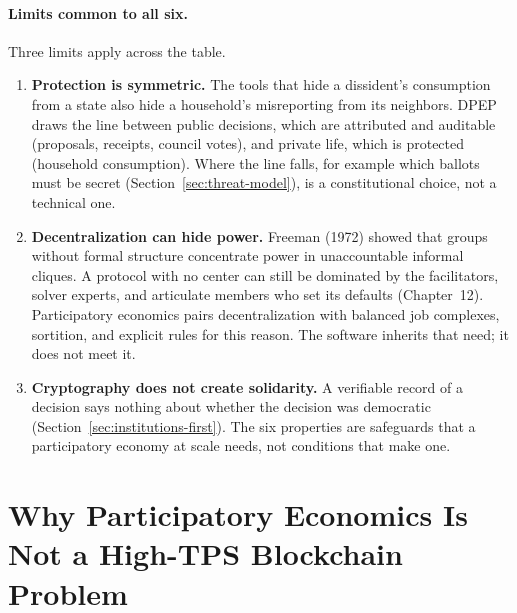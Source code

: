 \documentclass[10pt,twoside,openany]{book}
\theoremstyle{dpepstyle}
\begin{document}
\paragraph{Limits common to all six.} Three limits apply across the table.
\begin{enumerate}[leftmargin=1.8em,itemsep=2pt]
  \item \textbf{Protection is symmetric.} The tools that hide a dissident's consumption from a state also hide a household's misreporting from its neighbors. DPEP draws the line between public decisions, which are attributed and auditable (proposals, receipts, council votes), and private life, which is protected (household consumption). Where the line falls, for example which ballots must be secret (Section~\ref{sec:threat-model}), is a constitutional choice, not a technical one.
  \item \textbf{Decentralization can hide power.} Freeman (1972) showed that groups without formal structure concentrate power in unaccountable informal cliques. A protocol with no center can still be dominated by the facilitators, solver experts, and articulate members who set its defaults (Chapter~12). Participatory economics pairs decentralization with balanced job complexes, sortition, and explicit rules for this reason. The software inherits that need; it does not meet it.
  \item \textbf{Cryptography does not create solidarity.} A verifiable record of a decision says nothing about whether the decision was democratic (Section~\ref{sec:institutions-first}). The six properties are safeguards that a participatory economy at scale needs, not conditions that make one.
\end{enumerate}

\section{Why Participatory Economics Is Not a High-TPS Blockchain Problem}
\label{sec:not-blockchain}
\end{document}
